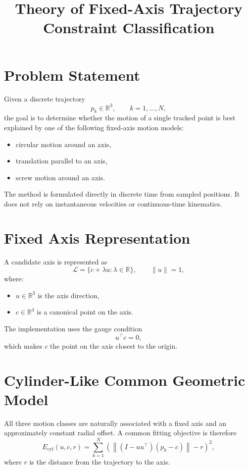 \documentclass[11pt]{article}
\title{Theory of Fixed-Axis Trajectory Constraint Classification}
\author{}
\date{}
\begin{document}
\maketitle

\section{Problem Statement}

Given a discrete trajectory
\[
p_k \in \mathbb{R}^3, \qquad k=1,\dots,N,
\]
the goal is to determine whether the motion of a single tracked point is best explained by one of the following fixed-axis motion models:
\begin{itemize}
    \item circular motion around an axis,
    \item translation parallel to an axis,
    \item screw motion around an axis.
\end{itemize}

The method is formulated directly in discrete time from sampled positions. It does not rely on instantaneous velocities or continuous-time kinematics.

\section{Fixed Axis Representation}

A candidate axis is represented as
\[
\mathcal{L} = \{c + \lambda u : \lambda \in \mathbb{R}\}, \qquad \|u\| = 1,
\]
where:
\begin{itemize}
    \item $u \in \mathbb{R}^3$ is the axis direction,
    \item $c \in \mathbb{R}^3$ is a canonical point on the axis.
\end{itemize}

The implementation uses the gauge condition
\[
u^\top c = 0,
\]
which makes $c$ the point on the axis closest to the origin.

\section{Cylinder-Like Common Geometric Model}

All three motion classes are naturally associated with a fixed axis and an approximately constant radial offset. A common fitting objective is therefore
\[
E_{\mathrm{cyl}}(u,c,r)
=
\sum_{k=1}^{N}
\left(
\left\|
(I - uu^\top)(p_k - c)
\right\|
- r
\right)^2,
\]
where $r$ is the distance from the trajectory to the axis.
\end{document}
